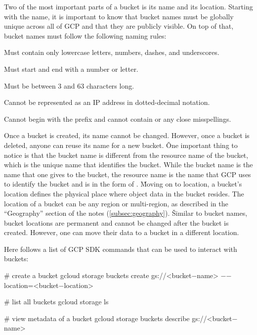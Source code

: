 Two of the most important parts of a bucket is its name and its location. Starting with the name, it is important to
know that bucket names must be globally unique across all of GCP and that they are publicly visible. On top of that,
bucket names must follow the following naming rules:
\bit
\item Must contain only lowercase letters, numbers, dashes, and underscores.
\item Must start and end with a number or letter.
\item Must be between 3 and 63 characters long.
\item Cannot be represented as an IP address in dotted-decimal notation.
\item Cannot begin with the  prefix and cannot contain  or any close misspellings.
\eit

Once a bucket is created, its name cannot be changed. However, once a bucket is deleted, anyone can reuse its name for
a new bucket. \v

One important thing to notice is that the bucket name is different from the resource name of the bucket, which is the
unique name that identifies the bucket. While the bucket name is the name that one gives to the bucket, the resource
name is the name that GCP uses to identify the bucket and is in the form of .
\v

Moving on to location, a bucket's location defines the physical place where object data in the bucket resides. The
location of a bucket can be any region or multi-region, as described in the ``Geography'' section of the notes
(\ref{subsec:geography}). \v

Similar to bucket names, bucket locations are permanent and cannot be changed after the bucket is created. However,
one can move their data to a bucket in a different location.

\newpage

Here follows a list of GCP SDK commands that can be used to interact with buckets:
\begin{bash}
# create a bucket
gcloud storage buckets create gs://<bucket$-$name> $-$$-$location=<bucket$-$location>
\end{bash}

\begin{bash}
# list all buckets
gcloud storage ls
\end{bash}

\begin{bash}
# view metadata of a bucket
gcloud storage buckets describe gs://<bucket$-$name>
\end{bash}

